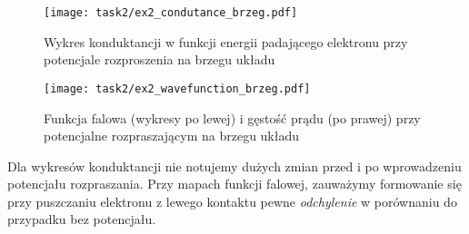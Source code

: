 \documentclass{article}
\begin{document}
\begin{figure}[htp!]
    \centering
    \texttt{[image: task2/ex2\_condutance\_brzeg.pdf]}
    \caption{Wykres konduktancji w funkcji energii padającego elektronu przy potencjale rozproszenia na brzegu układu}
    \label{fig:task2-conductance-brzeg}
\end{figure}
\begin{figure}[htp!]
    \centering
    \texttt{[image: task2/ex2\_wavefunction\_brzeg.pdf]}
    \caption{Funkcja falowa (wykresy po lewej) i gęstość prądu (po prawej) przy potencjalne rozpraszającym na brzegu układu }
    \label{fig:task2/current-wf}
\end{figure}
Dla wykresów konduktancji nie notujemy dużych zmian przed i po wprowadzeniu potencjału rozpraszania.
Przy mapach funkcji falowej, zauważymy formowanie się przy puszczaniu elektronu z lewego kontaktu pewne \textit{odchylenie} w porównaniu do przypadku bez potencjału.
\end{document}
